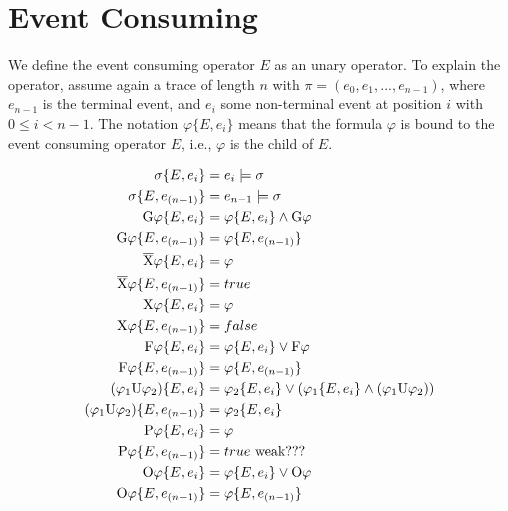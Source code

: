 
\section{Event Consuming}
\label{sec:event_consuming}
We define the event consuming operator $E$ as an unary operator. To explain the operator, assume again a trace of length $n$ with $\pi=(e_0, e_1, ..., e_{n-1})$, where $e_{n-1}$ is the terminal event, and $e_i$ some non-terminal event at position $i$ with $0 \leq i < n-1$. The notation $\varphi\{E, e_i\}$ means that the formula $\varphi$ is bound to the event consuming operator $E$, i.e., $\varphi$ is the child of $E$. 

\begin{align}
	\sigma\{E, e_i\} &= e_i \models \sigma\\
	\sigma\{E, e_{(n-1)}\} &= e_{n-1} \models \sigma\\
	\text{\ensuremath{\text{G}}}\varphi\{E, e_i\} &= \varphi\{E, e_i\} \land \text{\ensuremath{\text{G}}}\varphi\\
	\text{\ensuremath{\text{G}}}\varphi\{E, e_{(n-1)}\} &= \varphi\{E, e_{(n-1)}\}\\
	\text{\ensuremath{\overline{\text{X}}}}\varphi\{E, e_i\} &= \varphi\\
	\text{\ensuremath{\overline{\text{X}}}} \varphi\{E, e_{(n-1)}\} &= true\\
	\text{\ensuremath{\text{X}}}\varphi\{E, e_i\}  &= \varphi \\
	\text{\ensuremath{\text{X}}}\varphi\{E, e_{(n-1)}\} &= false\\
	\text{\ensuremath{\text{F}}}\varphi\{E, e_i\} &= \varphi\{E, e_i\} \lor \text{\ensuremath{\text{F}}}\varphi\\
	\text{\ensuremath{\text{F}}}\varphi\{E, e_{(n-1)}\} &= \varphi\{E, e_{(n-1)}\}\\
	(\varphi_1 \text{\ensuremath{\text{U}}} \varphi_2)\{E, e_i\} &=  \varphi_2\{E, e_i\} \lor (\varphi_1\{E, e_i\} \land (\varphi_1 \text{\ensuremath{\text{U}}} \varphi_2))\\
	(\varphi_1 \text{\ensuremath{\text{U}}} \varphi_2)\{E, e_{(n-1)}\} &= \varphi_2\{E, e_i\} \\
	\text{\ensuremath{\text{P}}}\varphi\{E, e_i\}  &= \varphi \\
	\text{\ensuremath{\text{P}}}\varphi\{E, e_{(n-1)}\} &= true \text{~weak???}\\
	\text{\ensuremath{\text{O}}}\varphi\{E, e_i\} &= \varphi\{E, e_i\} \lor \text{\ensuremath{\text{O}}}\varphi\\
	\text{\ensuremath{\text{O}}}\varphi\{E, e_{(n-1)}\} &= \varphi\{E, e_{(n-1)}\}
\end{align}     
